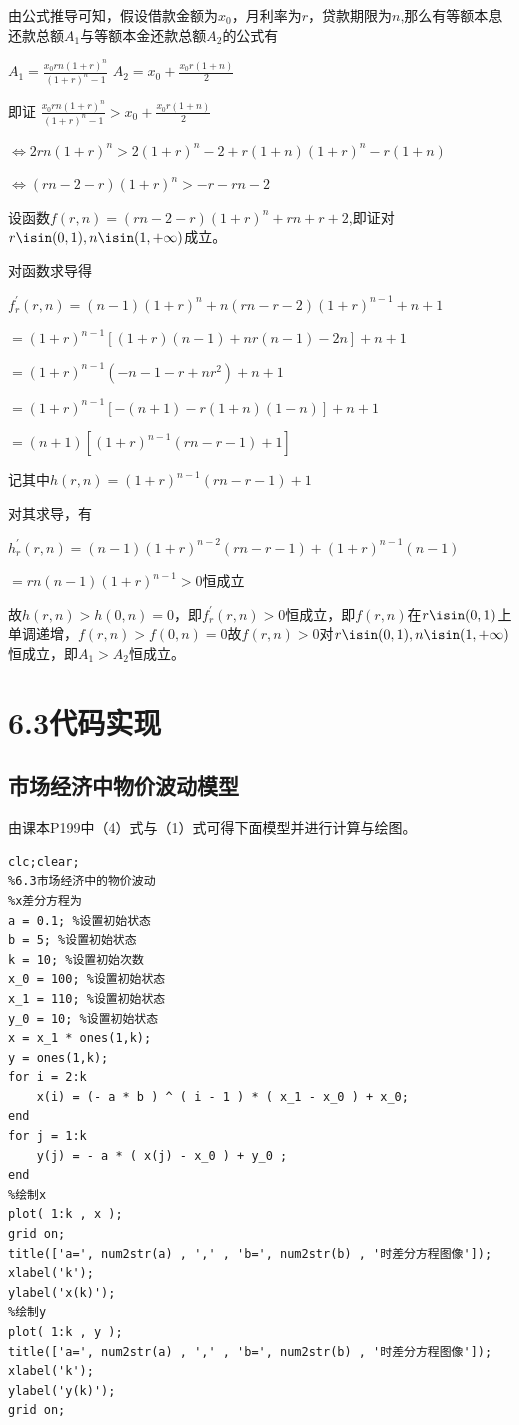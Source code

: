 \documentclass{ctexart}
\begin{document}
\begin{Large}
\setlength{\parindent}{2em}由公式推导可知，假设借款金额为$x_{0}$，月利率为$r$，贷款期限为$n$,那么有等额本息还款总额$A_{1}$与等额本金还款总额$A_{2}$的公式有



$A_{1}=\frac{x_{0}rn(1+r)^n}{(1+r)^n-1}$ \qquad $A_{2}=x_{0}+\frac{x_{0}r(1+n)}{2}$


即证
$\frac{x_{0}rn(1+r)^n}{(1+r)^n-1}>x_{0}+\frac{x_{0}r(1+n)}{2}$

$\Leftrightarrow 2rn(1+r)^n>2(1+r)^n-2+r(1+n)(1+r)^n-r(1+n)$

$\Leftrightarrow (rn-2-r)(1+r)^n>-r-rn-2$

设函数$f(r,n)=(rn-2-r)(1+r)^n+rn+r+2$,即证对$r\isin(0,1),n\isin(1,+\infty)$成立。


对函数求导得


$f_{r}^{\prime}(r,n)=(n-1)(1+r)^n+n(rn-r-2)(1+r)^{n-1}+n+1$

$=(1+r)^{n-1}[(1+r)(n-1)+nr(n-1)-2n]+n+1$

$=(1+r)^{n-1}(-n-1-r+nr^2)+n+1$

$=(1+r)^{n-1}[-(n+1)-r(1+n)(1-n)]+n+1$

$=(n+1)[(1+r)^{n-1}(rn-r-1)+1]$

记其中$h(r,n)=(1+r)^{n-1}(rn-r-1)+1$

对其求导，有

$h_{r}^{\prime}(r,n)=(n-1)(1+r)^{n-2}(rn-r-1)+(1+r)^{n-1}(n-1)$

$=rn(n-1)(1+r)^{n-1}>0$恒成立

故$h(r,n)>h(0,n)=0$，即$f_{r}^{\prime}(r,n)>0$恒成立，即$f(r,n)$在$r\isin(0,1)$上单调递增，$f(r,n)>f(0,n)=0$故$f(r,n)>0$对$r\isin(0,1),n\isin(1,+\infty)$恒成立，即$A_{1}>A_{2}$恒成立。
\end{Large}

\section{6.3代码实现}
\subsection{市场经济中物价波动模型}
由课本P199中（4）式与（1）式可得下面模型并进行计算与绘图。

\begin{lstlisting}
clc;clear;
%6.3市场经济中的物价波动
%x差分方程为
a = 0.1; %设置初始状态
b = 5; %设置初始状态
k = 10; %设置初始次数
x_0 = 100; %设置初始状态
x_1 = 110; %设置初始状态
y_0 = 10; %设置初始状态
x = x_1 * ones(1,k);
y = ones(1,k);
for i = 2:k
    x(i) = (- a * b ) ^ ( i - 1 ) * ( x_1 - x_0 ) + x_0;
end
for j = 1:k
    y(j) = - a * ( x(j) - x_0 ) + y_0 ;
end
%绘制x
plot( 1:k , x );
grid on;
title(['a=', num2str(a) , ',' , 'b=', num2str(b) , '时差分方程图像']);
xlabel('k');
ylabel('x(k)');
%绘制y
plot( 1:k , y );
title(['a=', num2str(a) , ',' , 'b=', num2str(b) , '时差分方程图像']);
xlabel('k');
ylabel('y(k)');
grid on;
\end{lstlisting}
\end{document}
